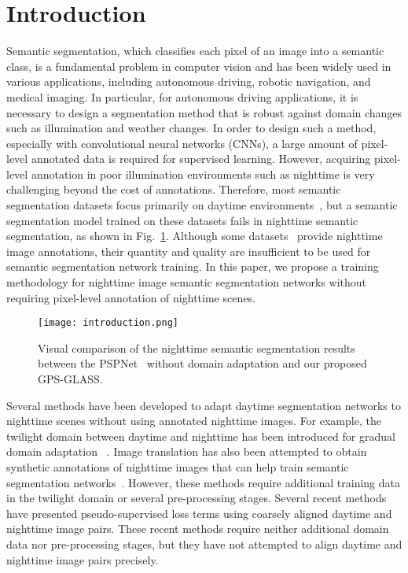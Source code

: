 \documentclass[10pt,twocolumn,letterpaper]{article}
\begin{document}
\section{Introduction}
{S}{emantic} segmentation, which classifies each pixel of an image into a semantic class, is a fundamental problem in computer vision and has been widely used in various applications, including autonomous driving, robotic navigation, and medical imaging. In particular, for autonomous driving applications, it is necessary to design a segmentation method that is robust against domain changes such as illumination and weather changes. In order to design such a method, especially with convolutional neural networks (CNNs), a large amount of pixel-level annotated data is required for supervised learning. However, acquiring pixel-level annotation in poor illumination environments such as nighttime is very challenging beyond the cost of annotations. Therefore, most semantic segmentation datasets focus primarily on daytime environments~\cite{Cordts2016Cityscapes,Geiger2013kitti}, but a semantic segmentation model trained on these datasets fails in nighttime semantic segmentation, as shown in Fig.~\ref{fig:intro}. Although some datasets~\cite{dai2018DMAda,yu2020bdd100k} provide nighttime image annotations, their quantity and quality are insufficient to be used for semantic segmentation network training. In this paper, we propose a training methodology for nighttime image semantic segmentation networks without requiring pixel-level annotation of nighttime scenes. 

\begin{figure}[!t]
  \centering
  \texttt{[image: introduction.png]}
  \caption{Visual comparison of the nighttime semantic segmentation
results between the PSPNet~\cite{zhao2017pyramid} without domain adaptation and our proposed GPS-GLASS.}
  \label{fig:intro}
\end{figure}

Several methods have been developed to adapt daytime segmentation networks to nighttime scenes without using annotated nighttime images. For example, the twilight domain between daytime and nighttime has been introduced for gradual domain adaptation
~\cite{dai2018DMAda,sakaridis2019guided,sakaridis2020map-guided}. Image translation has also been attempted to obtain synthetic annotations of nighttime images that can help train semantic segmentation networks~\cite{romera2019bridging,sun2019see}. However, these methods require additional training data in the twilight domain or several pre-processing stages. Several recent methods~\cite{wu2021dannet,xu2021cdada} have presented pseudo-supervised loss terms using coarsely aligned daytime and nighttime image pairs. These recent methods require neither additional domain data nor pre-processing stages, but they have not attempted to align daytime and nighttime image pairs precisely. 
\end{document}
